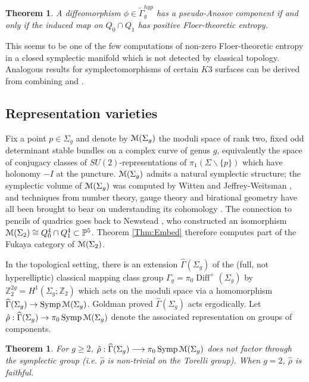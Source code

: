\documentclass[reqno,10pt]{amsart}
\numberwithin{equation}{section}
\newcommand{\bP}{{\mathbb P}}
\newcommand{\bZ}{{\mathbb Z}}
\newcommand{\scrM}{\EuScript{M}}
\newcommand{\Symp}{\operatorname{Symp}}
\newcommand{\Diff}{\operatorname{Diff}}
\newtheorem{Theorem}[thm]{Theorem}
\theoremstyle{remark}
\begin{document}
\begin{Theorem} \label{Thm:Entropy}
A diffeomorphism $\phi \in \tilde{\Gamma}_g^{hyp}$  has a  pseudo-Anosov component if and only if the induced map on $Q_0 \cap Q_1$ has positive Floer-theoretic entropy.
\end{Theorem}

This seems to be one of the few computations of non-zero Floer-theoretic entropy in a closed symplectic manifold which is  not detected by classical topology.   Analogous results for symplectomorphisms of certain $K3$ surfaces can be derived from combining \cite{Seidel:graded} and \cite{KhovanovSeidel}. 




\subsection{Representation varieties}\label{Sec:RepVar}


Fix a point $p\in \Sigma_g$ and  denote by $\scrM(\Sigma_g)$ the moduli space of rank two, fixed odd determinant stable bundles on a complex curve of genus $g$, equivalently the space of conjugacy classes of $SU(2)$-representations of $\pi_1(\Sigma\backslash\{p\})$ which have holonomy $-I$ at the puncture.  $\scrM(\Sigma_g)$ admits a natural symplectic structure; the symplectic volume of $\scrM(\Sigma_g)$ was computed by Witten  and Jeffrey-Weitsman \cite{Witten, JW}, and techniques from number theory, gauge theory and birational geometry have all been brought to bear on understanding its cohomology  \cite{NS, AtiyahBott, Thaddeus}.  The connection to pencils of quadrics goes back to Newstead \cite{Newstead}, who constructed an isomorphism  $\scrM(\Sigma_2) \cong Q^{4}_0\cap Q^{4}_1 \subset \bP^5$.  Theorem \ref{Thm:Embed} therefore computes part of the Fukaya category of $\scrM(\Sigma_2)$.  

In the topological setting, there is an extension $\widehat\Gamma(\Sigma_g)$  of the (full, not hyperelliptic) classical mapping class group $\Gamma_g=\pi_0\Diff^+(\Sigma_g)$ by $\bZ_2^{2g} = H^1(\Sigma_g;\bZ_2)$ which acts  on the moduli space via  a homomorphism $\widehat\Gamma(\Sigma_g) \rightarrow \Symp \scrM(\Sigma_g)$.       Goldman \cite{Goldman}  proved $\widehat{\Gamma}(\Sigma_g)$ acts ergodically.  Let $\hat\rho: \widehat\Gamma(\Sigma_g) \rightarrow \pi_0\Symp\scrM(\Sigma_g)$ denote the associated representation on groups of components.  

   
\begin{Theorem}  \label{Thm:NotSymplectic}
For $g\geq 2$,  $\hat{\rho}: \widehat\Gamma(\Sigma_g) \longrightarrow \pi_0\Symp \scrM(\Sigma_g)$ does not factor through the symplectic group (i.e. $\hat\rho$ is non-trivial on the Torelli group).  When $g=2$, $\hat\rho$ is faithful.
\end{Theorem}
\end{document}
